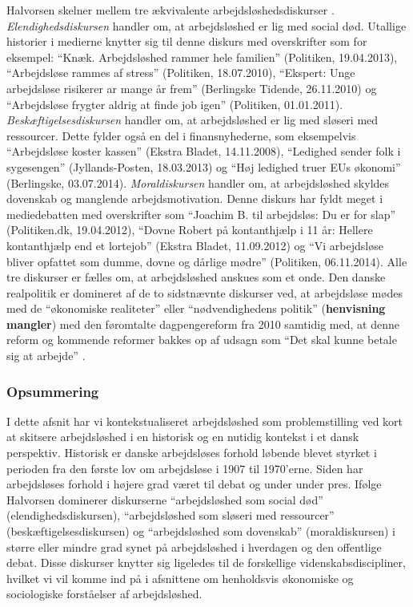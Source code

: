 Halvorsen skelner mellem tre ækvivalente arbejdsløshedsdiskurser \parencite[13]{Halvorsen1999}. \textit{Elendighedsdiskursen} handler om, at arbejdsløshed er lig med social død. Utallige historier i medierne knytter sig til denne diskurs med overskrifter som for eksempel: “Knæk. Arbejdsløshed rammer hele familien” (Politiken, 19.04.2013), “Arbejdsløse rammes af stress” (Politiken, 18.07.2010), “Ekspert: Unge arbejdsløse risikerer ar mange år frem” (Berlingske Tidende, 26.11.2010) og “Arbejdsløse frygter aldrig at finde job igen” (Politiken, 01.01.2011). \textit{Beskæftigelsesdiskursen} handler om, at arbejdsløshed er lig med sløseri med ressourcer. Dette fylder også en del i finansnyhederne, som eksempelvis “Arbejdsløse koster kassen” (Ekstra Bladet, 14.11.2008), “Ledighed sender folk i sygesengen” (Jyllands-Posten, 18.03.2013) og “Høj ledighed truer EUs økonomi” (Berlingske, 03.07.2014). \textit{Moraldiskursen} handler om, at arbejdsløshed skyldes dovenskab og manglende arbejdsmotivation. Denne diskurs har fyldt meget i mediedebatten med overskrifter som “Joachim B. til arbejdsløs: Du er for slap” (Politiken.dk, 19.04.2012), “Dovne Robert på kontanthjælp i 11 år: Hellere kontanthjælp end et lortejob” (Ekstra Bladet, 11.09.2012) og “Vi arbejdsløse bliver opfattet som dumme, dovne og dårlige mødre” (Politiken, 06.11.2014). Alle tre diskurser er fælles om, at arbejdsløshed anskues som et onde. Den danske realpolitik er domineret af de to sidstnævnte diskurser ved, at arbejdsløse mødes med de “økonomiske realiteter” eller “nødvendighedens politik” (\textbf{henvisning mangler}) med den føromtalte dagpengereform fra 2010 samtidig med, at denne reform og kommende reformer bakkes op af udsagn som “Det skal kunne betale sig at arbejde” \parencite{Stoejberg2015}. %


\subsubsection{Opsummering} 

I dette afsnit har vi kontekstualiseret arbejdsløshed som problemstilling ved kort at skitsere arbejdsløshed i en historisk og en nutidig kontekst i et dansk perspektiv. Historisk er danske arbejdsløses forhold løbende blevet styrket i perioden fra den første lov om arbejdsløse i 1907 til 1970'erne. Siden har arbejdsløses forhold i højere grad været til debat og under under pres. Ifølge Halvorsen dominerer diskurserne “arbejdsløshed som social død” (elendighedsdiskursen), “arbejdsløshed som sløseri med ressourcer” (beskæftigelsesdiskursen) og “arbejdsløshed som dovenskab” (moraldiskursen) i større eller mindre grad synet på arbejdsløshed i hverdagen og den offentlige debat. Disse diskurser knytter sig ligeledes til de forskellige videnskabsdiscipliner, hvilket vi vil komme ind på i afsnittene om henholdsvis økonomiske og sociologiske forståelser af arbejdsløshed.








